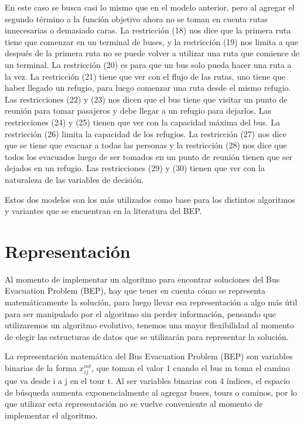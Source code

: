 \documentclass[letter, 10pt]{article}
\begin{document}
En este caso se busca casi lo mismo que en el modelo anterior, pero al agregar el segundo término a la función objetivo ahora no se toman en cuenta rutas innecesarias o demasiado caras. La restricción (18) nos dice que la primera ruta tiene que comenzar en un terminal de buses, y la restricción (19) nos limita a que después de la primera ruta no se puede volver a utilizar una ruta que comience de un terminal. La restricción (20) es para que un bus solo pueda hacer una ruta a la vez. La restricción (21) tiene que ver con el flujo de las rutas, uno tiene que haber llegado un refugio, para luego comenzar una ruta desde el mismo refugio. Las restricciones (22) y (23) nos dicen que el bus tiene que visitar un punto de reunión para tomar pasajeros y debe llegar a un refugio para dejarlos. Las restricciones (24) y (25) tienen que ver con la capacidad máxima del bus. La restricción (26) limita la capacidad de los refugios. La restricción (27) nos dice que se tiene que evacuar a todas las personas y la restricción (28) nos dice que todos los evacuados luego de ser tomados en un punto de reunión tienen que ser dejados en un refugio. Las restricciones (29) y (30) tienen que ver con la naturaleza de las variables de decisión.

Estos dos modelos son los más utilizados como base para los distintos algoritmos y variantes que se encuentran en la literatura del BEP.

\section{Representaci\'on}
Al momento de implementar un algoritmo para encontrar soluciones del Bus Evacuation Problem (BEP), hay que tener en cuenta cómo se representa matemáticamente la solución, para luego llevar esa representación a algo más útil para ser manipulado por el algoritmo sin perder información, pensando que utilizaremos un algoritmo evolutivo, tenemos una mayor flexibilidad al momento de elegir las estructuras de datos que se utilizarán para representar la solución. 

La representación matemática del Bus Evacuation Problem (BEP) son variables binarias de la forma $x_{ij}^{mt}$, que toman el valor 1 cuando el bus m toma el camino que va desde i a j en el tour t. Al ser variables binarias con 4 índices, el espacio de búsqueda aumenta exponencialmente al agregar buses, tours o caminos, por lo que utilizar esta representación no se vuelve conveniente al momento de implementar el algoritmo.
\end{document}
